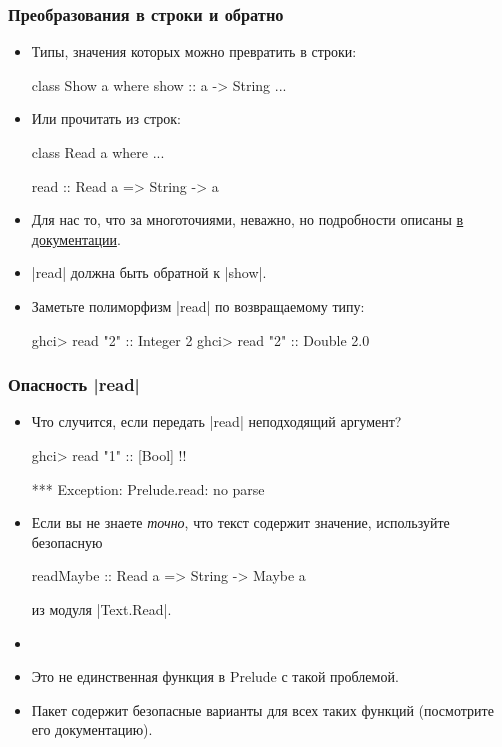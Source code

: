 \documentclass[10pt]{beamer}
\begin{document}
\begin{frame}[fragile]
  \frametitle{Преобразования в строки и обратно}
  \begin{itemize}
    \item
          Типы, значения которых можно превратить в строки:
          \begin{haskell}
            class Show a where
                show :: a -> String 
                ...
          \end{haskell}
          \pause
    \item Или прочитать из строк:
          \begin{haskell}
            class Read a where ...

            read :: Read a => String -> a
          \end{haskell}
          \pause
    \item Для нас то, что за многоточиями, неважно, но подробности описаны \href{http://hackage.haskell.org/package/base-4.10.1.0/docs/Prelude.html#g:22}{в документации}.\pause
    \item \haskinline|read| должна быть обратной к \haskinline|show|.
    \item Заметьте полиморфизм \haskinline|read| по возвращаемому типу:
          \begin{haskell}
            ghci> read "2" :: Integer
            2
            ghci> read "2" :: Double
            2.0
          \end{haskell}
  \end{itemize}
\end{frame}

\begin{frame}[fragile]
  \frametitle{Опасность \haskinline|read|}
  \begin{itemize}
    \item Что случится, если передать \haskinline|read| неподходящий аргумент?
          \begin{haskell}
            ghci> read "1" :: [Bool] !\pause!
          \end{haskell}
          \begin{ghci}
            *** Exception: Prelude.read: no parse
          \end{ghci}
    \item Если вы не знаете \emph{точно}, что текст содержит значение, используйте безопасную
          \begin{haskell}
            readMaybe :: Read a => String -> Maybe a
          \end{haskell}
          из модуля \haskinline|Text.Read|.
          \pause
    \item[]
    \item Это не единственная функция в Prelude с такой проблемой.
    \item Пакет  содержит безопасные варианты для всех таких функций (посмотрите его документацию).
  \end{itemize}
\end{frame}
\end{document}
